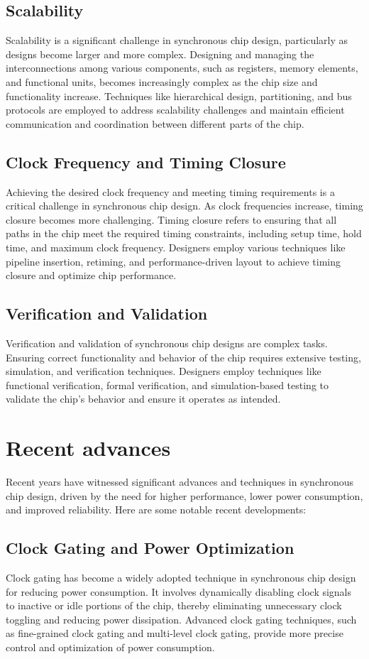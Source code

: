 \documentclass[a4paper,11pt]{report}
\begin{document}
\section{Scalability}
Scalability is a significant challenge in synchronous chip design, particularly as designs become larger and more complex. Designing and managing the interconnections among various components, such as registers, memory elements, and functional units, becomes increasingly complex as the chip size and functionality increase. Techniques like hierarchical design, partitioning, and bus protocols are employed to address scalability challenges and maintain efficient communication and coordination between different parts of the chip.

\section{Clock Frequency and Timing Closure}
Achieving the desired clock frequency and meeting timing requirements is a critical challenge in synchronous chip design. As clock frequencies increase, timing closure becomes more challenging. Timing closure refers to ensuring that all paths in the chip meet the required timing constraints, including setup time, hold time, and maximum clock frequency. Designers employ various techniques like pipeline insertion, retiming, and performance-driven layout to achieve timing closure and optimize chip performance.

\section{Verification and Validation}
Verification and validation of synchronous chip designs are complex tasks. Ensuring correct functionality and behavior of the chip requires extensive testing, simulation, and verification techniques. Designers employ techniques like functional verification, formal verification, and simulation-based testing to validate the chip's behavior and ensure it operates as intended.

\chapter{Recent advances}
Recent years have witnessed significant advances and techniques in synchronous chip design, driven by the need for higher performance, lower power consumption, and improved reliability. Here are some notable recent developments:

\section{Clock Gating and Power Optimization}
Clock gating has become a widely adopted technique in synchronous chip design for reducing power consumption. It involves dynamically disabling clock signals to inactive or idle portions of the chip, thereby eliminating unnecessary clock toggling and reducing power dissipation. Advanced clock gating techniques, such as fine-grained clock gating and multi-level clock gating, provide more precise control and optimization of power consumption.
\end{document}
